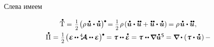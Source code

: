 \begin{otherlanguage}{russian}
\vspace{-0.2em} Слева имеем
\nopagebreak\vspace{-0.12em}\[\begin{array}{c}
\mathdotabove{\mathrm{T}} =^{\displaystyle \mathstrut^{\displaystyle \mathstrut}} \smalldisplaystyleonehalf \hspace{-0.25ex} \left( \rho \hspace{0.2ex} \mathdotabove{\bm{u}} \dotp^{\mathstrut} \hspace{-0.16ex} \mathdotabove{\bm{u}} \right)^{\tikz[baseline=-0.2ex] \draw[black, fill=black] (0,0) circle (.28ex);} \hspace{-0.25ex}
= \smalldisplaystyleonehalf \hspace{0.2ex} \rho \hspace{-0.1ex} \left( \mathdotabove{\bm{u}} \dotp \mathdotdotabove{\bm{u}} + \mathdotdotabove{\bm{u}} \dotp \mathdotabove{\bm{u}} \right) \hspace{-0.12ex} =
\rho \hspace{.2ex} \mathdotabove{\bm{u}} \dotp \mathdotdotabove{\bm{u}} \hspace{.1ex} , \\[.5em]
%
\mathdotabove{\Pi} \hspace{0.1ex} = \hspace{0.1ex} \smash{\smalldisplaystyleonehalf} \hspace{-0.25ex} \tikzmark{beginDerivativeOfElasticPotential} \left( \hspace{.1ex} \mathboldepsilon \hspace{-0.1ex} \dotdotp \hspace{-0.1ex} \stiffnesstensor \dotdotp \mathboldepsilon \hspace{.1ex} \right)^{\tikz[baseline=-0.2ex] \draw[black, fill=black] (0,0) circle (.28ex);} \hspace{-1.2ex} \tikzmark{endDerivativeOfElasticPotential} \hspace{.8ex}
= \mathboldtau \dotdotp \mathdotabove{\mathboldepsilon}
= \mathboldtau \hspace{0.1ex} \dotdotp \hspace{-0.12ex} \boldnabla \mathdotabove{\bm{u}}^{\hspace{0.1ex}\mathsf{S}} \hspace{-0.12ex} =
\boldnabla \hspace{-0.1ex} \dotp \left( \hspace{0.1ex} \mathboldtau \dotp \mathdotabove{\bm{u}} \hspace{0.1ex} \right) -

\end{array}\]
\end{otherlanguage}
